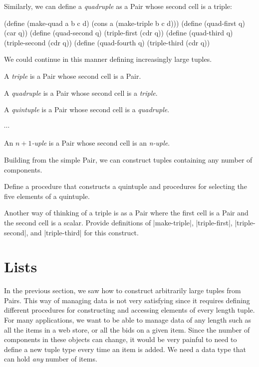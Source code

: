 \begin{schemeregion}
Similarly, we can define a \emph{quadruple} as a Pair whose second cell is a triple:
\begin{schemedisplay}
(define (make-quad a b c d) (cons a (make-triple b c d)))
(define (quad-first q)  (car q))
(define (quad-second q) (triple-first (cdr q))
(define (quad-third q)  (triple-second (cdr q))
(define (quad-fourth q) (triple-third (cdr q))
\end{schemedisplay}

We could continue in this manner defining increasingly large tuples.  
\begin{tightdescriptionlist}
\item[A \emph{triple} is a Pair whose second cell is a Pair.]
\item[A \emph{quadruple} is a Pair whose second cell is a \emph{triple}.]
\item[A \emph{quintuple} is a Pair whose second cell is a \emph{quadruple}.]
\item[$\cdots$]
\item[An $n+1$\emph{-uple} is a Pair whose second cell is an \emph{n-uple}.]
\end{tightdescriptionlist}
Building from the simple Pair, we can construct tuples containing any number of components.

\beforeex
\begin{exercise}
Define a procedure that constructs a quintuple and procedures for selecting the five elements of a quintuple.
\solution{\LATER{}}
\end{exercise}
\afterex

\beforeex
\begin{exercise}
Another way of thinking of a triple is as a Pair where the first cell is a Pair and the second cell is a scalar.  Provide definitions of \scheme|make-triple|, \scheme|triple-first|, \scheme|triple-second|, and \scheme|triple-third| for this construct.
\solution{\LATER{}}
\end{exercise}
\afterex

\section{Lists}\label{sec:list}
In the previous section, we saw how to construct arbitrarily large tuples from Pairs.  This way of managing data is not very satisfying since it requires defining different procedures for constructing and accessing elements of every length tuple.  For many applications, we want to be able to manage data of any length such as all the items in a web store, or all the bids on a given item.  Since the number of components in these objects can change, it would be very painful to need to define a new tuple type every time an item is added.  We need a data type that can hold \emph{any} number of items.  


\end{schemeregion}
